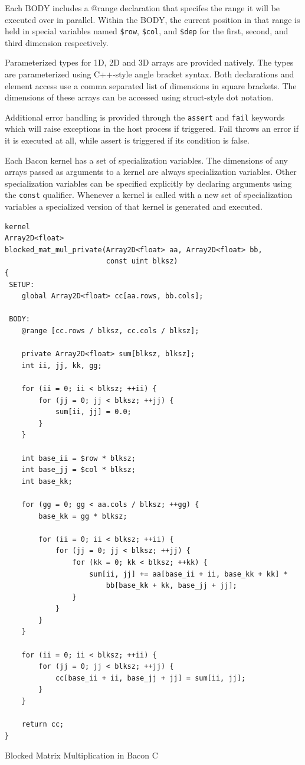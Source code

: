 \documentclass{llncs}
\begin{document}
Each BODY includes a @range declaration that specifes the range it
will be executed over in parallel. Within the BODY, the current
position in that range is held in special variables named {\tt\$row},
{\tt\$col}, and {\tt\$dep} for the first, second, and third dimension
respectively.

Parameterized types for 1D, 2D and 3D arrays are provided
natively. The types are parameterized using C++-style angle bracket
syntax. Both declarations and element access use a comma separated
list of dimensions in square brackets. The dimensions of these arrays
can be accessed using struct-style dot notation.

Additional error handling is provided through the {\tt assert} and
{\tt fail} keywords which will raise exceptions in the host process if
triggered. Fail throws an error if it is executed at all, while assert
is triggered if its condition is false.

Each Bacon kernel has a set of specialization variables. The
dimensions of any arrays passed as arguments to a kernel are always
specialization variables. Other specialization variables can be
specified explicitly by declaring arguments using the {\tt const}
qualifier. Whenever a kernel is called with a new set of
specialization variables a specialized version of that kernel is
generated and executed.

\begin{listing}[t!]
\begin{verbatim}
kernel
Array2D<float>
blocked_mat_mul_private(Array2D<float> aa, Array2D<float> bb, 
                        const uint blksz)
{
 SETUP:
    global Array2D<float> cc[aa.rows, bb.cols];

 BODY:
    @range [cc.rows / blksz, cc.cols / blksz];

    private Array2D<float> sum[blksz, blksz];
    int ii, jj, kk, gg;

    for (ii = 0; ii < blksz; ++ii) {
        for (jj = 0; jj < blksz; ++jj) {
            sum[ii, jj] = 0.0;
        }
    }

    int base_ii = $row * blksz;
    int base_jj = $col * blksz;
    int base_kk;

    for (gg = 0; gg < aa.cols / blksz; ++gg) {
        base_kk = gg * blksz;

        for (ii = 0; ii < blksz; ++ii) {
            for (jj = 0; jj < blksz; ++jj) {
                for (kk = 0; kk < blksz; ++kk) {
                    sum[ii, jj] += aa[base_ii + ii, base_kk + kk] * 
                        bb[base_kk + kk, base_jj + jj];
                }
            }
        }
    }

    for (ii = 0; ii < blksz; ++ii) {
        for (jj = 0; jj < blksz; ++jj) {
            cc[base_ii + ii, base_jj + jj] = sum[ii, jj];
        }
    }

    return cc;
}
\end{verbatim}
\caption{Blocked Matrix Multiplication in Bacon C}\label{bmmk}
\end{listing}
\afterpage{\FloatBarrier}
\end{document}
